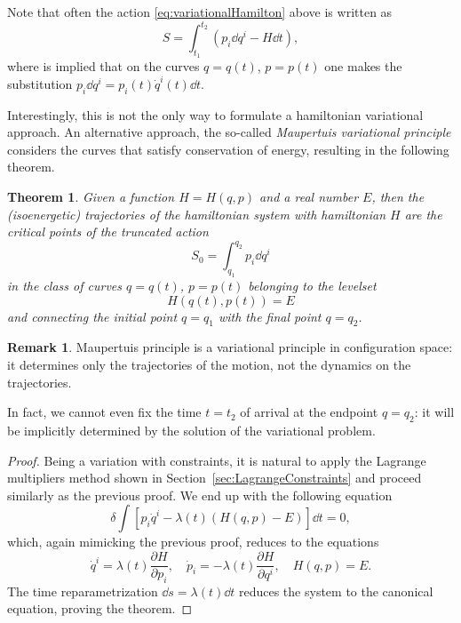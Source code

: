 \documentclass[english,fontsize=11pt,paper=b5]{scrbook}
\numberwithin{equation}{chapter}
\newtheorem{theorem}{Theorem}[chapter]
\theoremstyle{definition}
\newtheorem{remark}{Remark}[chapter]
\begin{document}
    Note that often the action \eqref{eq:variationalHamilton} above is written as
    \begin{equation}
      S = \int_{t_1}^{t_2} (p_i \dd q^i - H \dd t),
    \end{equation}
    where is implied that on the curves $q=q(t)$, $p=p(t)$ one makes the substitution $p_i \dd q^i = p_i(t) \dot q^i (t) \dd t$.

    Interestingly, this is not the only way to formulate a hamiltonian variational approach.
    An alternative approach, the so-called \emph{Maupertuis variational principle} considers the curves that satisfy conservation of energy, resulting in the following theorem.

    \begin{theorem}
      Given a function $H=H(q,p)$ and a real number $E$, then the (isoenergetic) \emph{trajectories} of the hamiltonian system with hamiltonian $H$ are the critical points of the truncated action
      \begin{equation}\label{eq:variationalMaupertuis}
        S_0 = \int_{q_1}^{q_2} p_i \dd q^i
      \end{equation}
      in the class of curves $q=q(t)$, $p=p(t)$ belonging to the levelset
      \begin{equation}
        H(q(t),p(t)) = E
      \end{equation}
      and connecting the initial point $q=q_1$ with the final point $q=q_2$.
    \end{theorem}

    \begin{remark}
      Maupertuis principle is a variational principle in configuration space: it determines only the trajectories of the motion, not the dynamics on the trajectories.

      In fact, we cannot even fix the time $t=t_2$ of arrival at the endpoint $q=q_2$: it will be implicitly determined by the solution of the variational problem.
    \end{remark}

    \begin{proof}
      Being a variation with constraints, it is natural to apply the Lagrange multipliers method shown in Section~\ref{sec:LagrangeConstraints} and proceed similarly as the previous proof. We end up with the following equation
      \begin{equation}
        \delta \int \left[p_i \dot q^i - \lambda(t)\left(H(q,p) - E\right)\right]\dd t = 0,
      \end{equation}
      which, again mimicking the previous proof, reduces to the equations
      \begin{equation}
        \dot q^i = \lambda(t) \frac{\partial H}{\partial p_i},
        \quad
        \dot p_i = -\lambda(t) \frac{\partial H}{\partial q^i},
        \quad H(q,p) = E.
      \end{equation}
      The time reparametrization $\dd s = \lambda(t)\dd t$ reduces the system to the canonical equation, proving the theorem.
    \end{proof}
\end{document}
